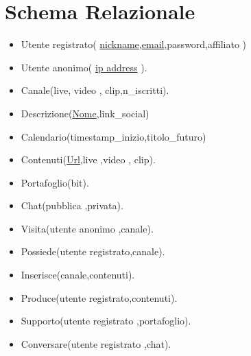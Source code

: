 \section*{Schema Relazionale}
\begin{itemize}
    \item Utente registrato( \underline{nickname},\underline{email},password,affiliato  )
    \item Utente anonimo( \underline{ip address} ).
    \item Canale(live, video , clip,n_iscritti).
    \item Descrizione(\underline{Nome},link_social) 
    \item Calendario(timestamp_inizio,titolo_futuro)
    \item Contenuti(\underline{Url},live ,video , clip).
    \item Portafoglio(bit). 
    \item Chat(pubblica ,privata). 
    \item Visita(utente anonimo ,canale).
    \item Possiede(utente registrato,canale).
    \item Inserisce(canale,contenuti).
    \item Produce(utente registrato,contenuti).
    \item Supporto(utente registrato ,portafoglio).
    \item Conversare(utente registrato ,chat).
\end{itemize}